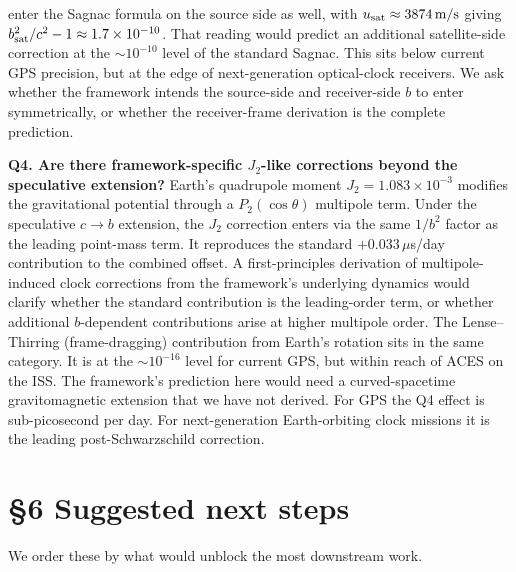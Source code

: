 \documentclass[
  11pt,
]{article}
\begin{document}
enter the Sagnac formula on the source side as well, with
\(u_{\rm sat} \approx 3874\,\text{m/s}\) giving
\(b_{\rm sat}^2/c^2 - 1 \approx 1.7 \times 10^{-10}\). That reading
would predict an additional satellite-side correction at the
\(\sim 10^{-10}\) level of the standard Sagnac. This sits below current
GPS precision, but at the edge of next-generation optical-clock
receivers. We ask whether the framework intends the source-side and
receiver-side \(b\) to enter symmetrically, or whether the
receiver-frame derivation is the complete prediction.

\textbf{Q4. Are there framework-specific \(J_2\)-like corrections beyond
the speculative extension?} Earth's quadrupole moment
\(J_2 = 1.083 \times 10^{-3}\) modifies the gravitational potential
through a \(P_2(\cos\theta)\) multipole term. Under the speculative
\(c \to b\) extension, the \(J_2\) correction enters via the same
\(1/b^2\) factor as the leading point-mass term. It reproduces the
standard \(+0.033\,\mu\)s/day contribution to the combined offset. A
first-principles derivation of multipole-induced clock corrections from
the framework's underlying dynamics would clarify whether the standard
contribution is the leading-order term, or whether additional
\(b\)-dependent contributions arise at higher multipole order. The
Lense--Thirring (frame-dragging) contribution from Earth's rotation sits
in the same category. It is at the \(\sim 10^{-16}\) level for current
GPS, but within reach of ACES on the ISS. The framework's prediction
here would need a curved-spacetime gravitomagnetic extension that we
have not derived. For GPS the Q4 effect is sub-picosecond per day. For
next-generation Earth-orbiting clock missions it is the leading
post-Schwarzschild correction.

\hypertarget{suggested-next-steps}{%
\section{§6 Suggested next steps}\label{suggested-next-steps}}

We order these by what would unblock the most downstream work.
\end{document}
